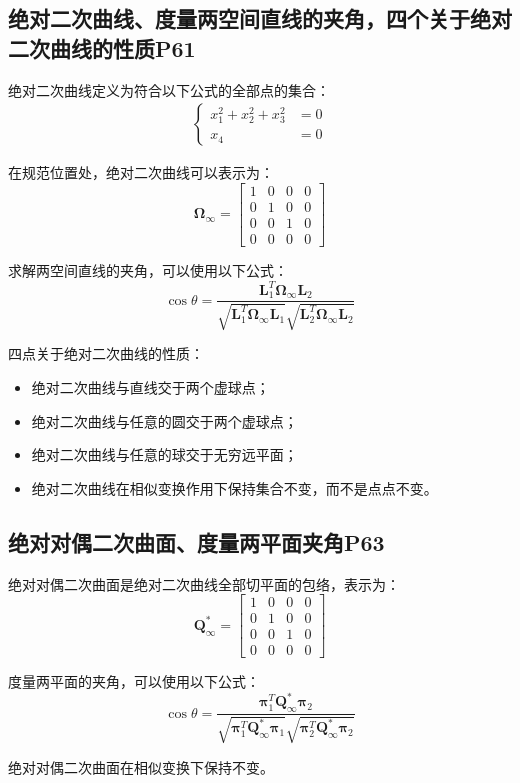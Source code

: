 \documentclass[11pt]{article}
\begin{document}
\subsection{	绝对二次曲线、度量两空间直线的夹角，四个关于绝对二次曲线的性质P61}
绝对二次曲线定义为符合以下公式的全部点的集合：
\begin{align*}
  \left\{
  \begin{aligned}
    x_1^2+x_2^2+x_3^2 & =0 \\
    x_4               & =0
  \end{aligned}
  \right.
\end{align*}\par
在规范位置处，绝对二次曲线可以表示为：
\begin{equation*}
  \mathbold{\Omega}_\infty=\begin{bmatrix}
    1 & 0 & 0 & 0 \\
    0 & 1 & 0 & 0 \\
    0 & 0 & 1 & 0 \\
    0 & 0 & 0 & 0
  \end{bmatrix}
\end{equation*}\par
求解两空间直线的夹角，可以使用以下公式：
\begin{equation*}
  \cos\theta=\frac{\mathbold{L}_1^T\mathbold{\Omega}_\infty\mathbold{L}_2}{\sqrt{\mathbold{L}_1^T\mathbold{\Omega}_\infty\mathbold{L}_1}\sqrt{\mathbold{L}_2^T\mathbold{\Omega}_\infty\mathbold{L}_2}}
\end{equation*}\par
四点关于绝对二次曲线的性质：
\begin{itemize}
  \item 绝对二次曲线与直线交于两个虚球点；
  \item 绝对二次曲线与任意的圆交于两个虚球点；
  \item 绝对二次曲线与任意的球交于无穷远平面；
  \item 绝对二次曲线在相似变换作用下保持集合不变，而不是点点不变。
\end{itemize}
\subsection{绝对对偶二次曲面、度量两平面夹角P63}
绝对对偶二次曲面是绝对二次曲线全部切平面的包络，表示为：
\begin{equation*}
  \mathbold{Q}^*_\infty=\begin{bmatrix}
    1 & 0 & 0 & 0 \\
    0 & 1 & 0 & 0 \\
    0 & 0 & 1 & 0 \\
    0 & 0 & 0 & 0
  \end{bmatrix}
\end{equation*}\par
度量两平面的夹角，可以使用以下公式：
\begin{equation*}
  \cos\theta=\frac{\mathbold{\pi}_1^T\mathbold{Q}^*_\infty\mathbold{\pi}_2}{\sqrt{\mathbold{\pi}_1^T\mathbold{Q}^*_\infty\mathbold{\pi}_1}\sqrt{\mathbold{\pi}_2^T\mathbold{Q}^*_\infty\mathbold{\pi}_2}}
\end{equation*}\par
绝对对偶二次曲面在相似变换下保持不变。
\end{document}
